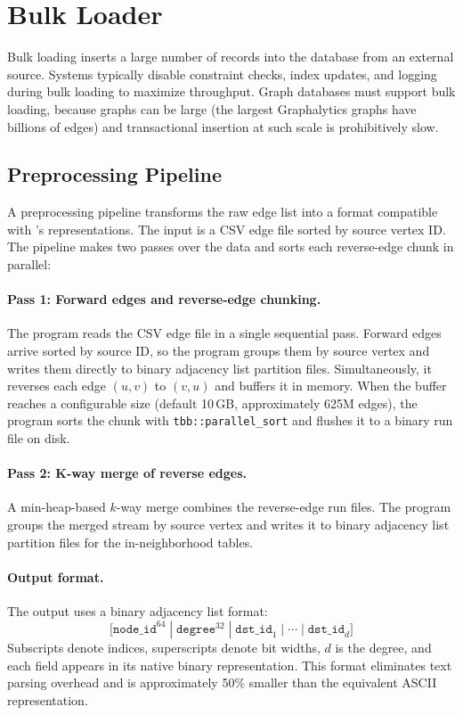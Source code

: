 \section{Bulk Loader}
\label{arch:bulkloading}

Bulk loading inserts a large number of records into the database from an external source.
Systems typically disable constraint checks, index updates, and logging during bulk loading to maximize throughput.
Graph databases must support bulk loading, because graphs can be large (the largest Graphalytics graphs have billions of edges) and transactional insertion at such scale is prohibitively slow.

\subsection{Preprocessing Pipeline}
\label{arch:bulk-preprocess}

A preprocessing pipeline transforms the raw edge list into a format compatible with \project{}'s representations.
The input is a CSV edge file sorted by source vertex ID.
The pipeline makes two passes over the data and sorts each reverse-edge chunk in parallel:

\paragraph{Pass 1: Forward edges and reverse-edge chunking.}
The program reads the CSV edge file in a single sequential pass.
Forward edges arrive sorted by source ID, so the program groups them by source vertex and writes them directly to binary adjacency list partition files.
Simultaneously, it reverses each edge $(u, v)$ to $(v, u)$ and buffers it in memory.
When the buffer reaches a configurable size (default 10\,GB, approximately 625M edges), the program sorts the chunk with \texttt{tbb::parallel\_sort}\cite{onetbb_parallel_sort} and flushes it to a binary run file on disk.

\paragraph{Pass 2: K-way merge of reverse edges.}
A min-heap-based $k$-way merge combines the reverse-edge run files.
The program groups the merged stream by source vertex and writes it to binary adjacency list partition files for the in-neighborhood tables.

\paragraph{Output format.}
The output uses a binary adjacency list format:
\[
  \texttt{[node\_id}^{64} \;|\; \texttt{degree}^{32} \;|\; \texttt{dst\_id}_1 \;|\; \cdots \;|\; \texttt{dst\_id}_{d}\texttt{]}
\]
Subscripts denote indices, superscripts denote bit widths, $d$ is the degree, and each field appears in its native binary representation.
This format eliminates text parsing overhead and is approximately 50\% smaller than the equivalent ASCII representation.

